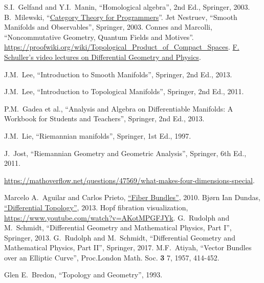 
\begin{thebibliography}{}
    S.I.~Gelfand and Y.I.~Manin, ``Homological algebra'', 2nd Ed., Springer, 2003.
     B.~Milewski, ``\href{https://github.com/hmemcpy/milewski-ctfp-pdf/}{Category Theory for Programmers}''.
     Jet Nestruev, ``Smooth Manifolds and Observables'', Springer, 2003.
     Connes and Marcolli, ``Noncommutative Geometry, Quantum Fields and Motives''.
     \url{https://proofwiki.org/wiki/Topological_Product_of_Compact_Spaces}.
     \href{https://www.youtube.com/playlist?list=PLPH7f_7ZlzxTi6kS4vCmv4ZKm9u8g5yic}{F. Schuller's video lectures on Differential Geometry and Physics}.
    
    J.M.~Lee, ``Introduction to Smooth Manifolds'', Springer, 2nd Ed., 2013.
    
    J.M.~Lee, ``Introduction to Topological Manifolds'', Springer, 2nd Ed., 2011. 
    
     P.M.~Gadea et al., ``Analysis and Algebra on Differentiable Manifolds: A Workbook for Students and Teachers'', Springer, 2nd Ed., 2013.
    
    J.M.~Lie, ``Riemannian manifolds'', Springer, 1st Ed., 1997.
    
     J.~Jost, ``Riemannian Geometry and Geometric Analysis'', Springer, 6th Ed., 2011.
    
    
     \url{https://mathoverflow.net/questions/47569/what-makes-four-dimensions-special}.
    
     Marcelo A.~Aguilar and Carlos Prieto, \href{https://paginas.matem.unam.mx/cprieto/phocadownloadpap/fiber%20bundles.pdf}{``Fiber Bundles''}, 2010.
     Bj{\o}rn Ian Dundas, \href{https://citeseerx.ist.psu.edu/document?repid=rep1&type=pdf&doi=0603e3854c4dc13a2a283072ef834b05e8eec607}{``Differential Topology''}, 2013.
     Hopf fibration visualization, \url{https://www.youtube.com/watch?v=AKotMPGFJYk}.
     G.~Rudolph and M.~Schmidt, ``Differential Geometry and Mathematical Physics, Part I'', Springer, 2013.
     G.~Rudolph and M.~Schmidt, ``Differential Geometry and Mathematical Physics, Part II'', Springer, 2017.
     M.F.~Atiyah, ``Vector Bundles over an Elliptic Curve'', Proc.London Math. Soc. \textbf{3} 7, 1957, 414-452.
    
     Glen E.~Bredon, ``Topology and Geometry'', 1993.
    

\end{thebibliography}
